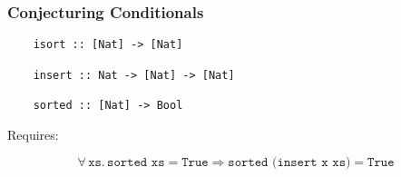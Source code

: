 \documentclass[serif,professionalfont]{beamer}
\newcommand\fa[1]{ \forall \, #1 . \,}
\newcommand\hs[1]{\texttt{#1}}
\newcommand\xs[0]{\hs{xs}}
\begin{document}
\begin{frame}[fragile]
  \frametitle{Conjecturing Conditionals}

  \sortedprop

  \begin{verbatim}
    isort :: [Nat] -> [Nat]

    insert :: Nat -> [Nat] -> [Nat]

    sorted :: [Nat] -> Bool
  \end{verbatim}

  \pause


  Requires:

  \begin{equation*}
    \fa{\xs}  \hs{sorted xs} = \hs{True} \Rightarrow
              \hs{sorted (insert x xs)} = \hs{True}
  \end{equation*}


\end{frame}
\end{document}
